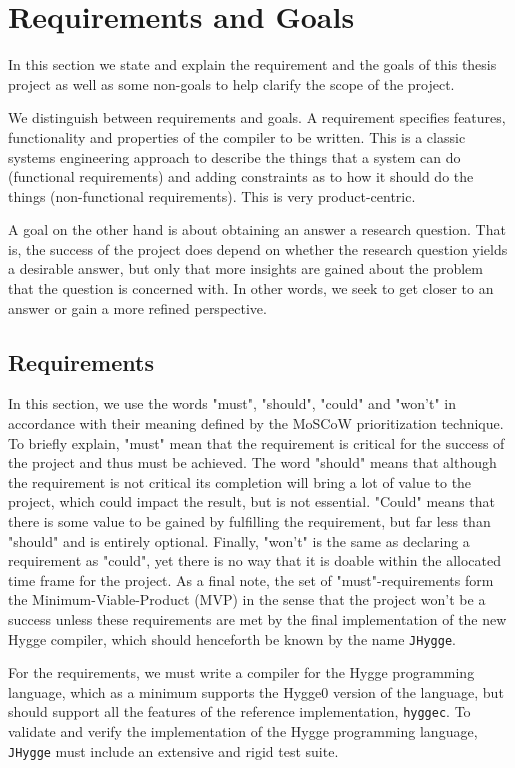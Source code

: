 \chapter{Requirements and Goals} \label{sec:requirements}

In this section we state and explain the requirement and the goals of this thesis project as well as some non-goals to help clarify the scope
of the project.

We distinguish between requirements and goals. A requirement specifies features, functionality and properties of the compiler to be written.
This is a classic systems engineering approach to describe the things that a system can do (functional requirements) and adding constraints as
to how it should do the things (non-functional requirements). This is very product-centric.

A goal on the other hand is about obtaining an answer a research question. That is, the success of the project does depend on whether the research
question yields a desirable answer, but only that more insights are gained about the problem that the question is concerned with. In other words,
we seek to get closer to an answer or gain a more refined perspective.

\section{Requirements}

In this section, we use the words "must", "should", "could" and "won't" in accordance with their meaning defined by the MoSCoW prioritization
technique. To briefly explain, "must" mean that the requirement is critical for the success of the project and thus must be achieved. The
word "should" means that although the requirement is not critical its completion will bring a lot of value to the project, which could impact
the result, but is not essential. "Could" means that there is some value to be gained by fulfilling the requirement, but far less than "should"
and is entirely optional.
Finally, "won't" is the same as declaring a requirement as "could", yet there is no way that it is doable within the allocated time frame for the project.
As a final note, the set of "must"-requirements form the Minimum-Viable-Product (MVP) in the sense that the project won't be a success unless these
requirements are met by the final implementation of the new Hygge compiler, which should henceforth be known by the name \texttt{JHygge}.

For the requirements, we must write a compiler for the Hygge programming language, which as a minimum supports the Hygge0 version of the language,
but should support all the features of the reference implementation, \texttt{hyggec}.
To validate and verify the implementation of the Hygge programming language, \texttt{JHygge} must include an extensive and rigid test suite.

